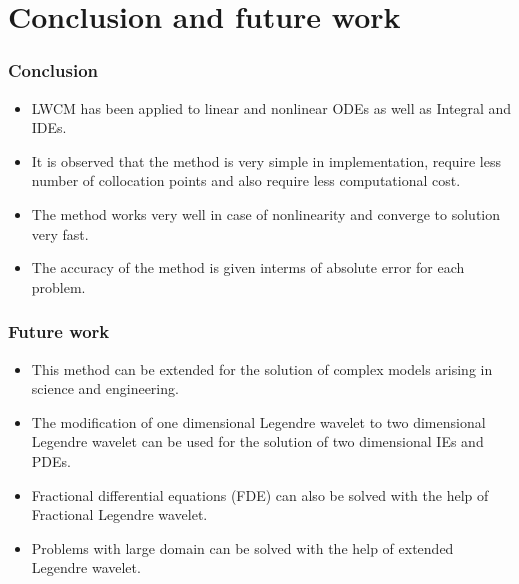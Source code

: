 \documentclass{beamer}
\begin{document}
\section{Conclusion and future work}
\begin{frame}\frametitle{Conclusion}
\justifying
\begin{itemize}
\item LWCM has been applied to linear and nonlinear ODEs as well as Integral and IDEs.
\item It is observed that the method is very simple in implementation, require less number of collocation points and also require less computational cost.
\item The method works very well in case of nonlinearity and converge to solution very fast. 
\item The accuracy of the method is given interms of absolute error for each problem.
\end{itemize}
\end{frame}
\begin{frame}\frametitle{Future work}
	\justifying
	\begin{itemize}
 \item This method can be extended for the solution of complex models arising in science and engineering.
\item  The modification of one dimensional Legendre wavelet to two dimensional Legendre wavelet can be used for the solution of two dimensional IEs and PDEs.
\item Fractional differential equations (FDE) can also be solved with the help of Fractional Legendre wavelet.
\item  Problems with large domain can be solved with the help of extended Legendre wavelet.
 \end{itemize}
\end{frame}
		
\end{document}
